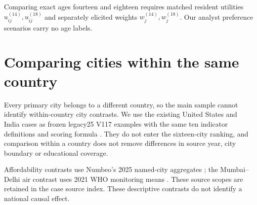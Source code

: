 \AgeCase



Comparing exact ages fourteen and eighteen requires matched resident utilities
$u_{ij}^{(14)},u_{ij}^{(18)}$ and separately elicited weights
$w_j^{(14)},w_j^{(18)}$. Our analyst preference scenarios carry no age labels.

\section{Comparing cities within the same country}
Every primary city belongs to a different country, so the main sample cannot
identify within-country city contrasts. We use the existing United States and
India cases as frozen legacy25 V117 examples with the same ten indicator
definitions and scoring formula \cite{legacycase}. They do not enter the sixteen-city ranking,
and comparison within a country does not remove differences in source year,
city boundary or educational coverage.



\CountryInterpretation
Affordability contrasts use Numbeo's 2025 named-city aggregates
\cite{numbeocase}; the Mumbai--Delhi air contrast uses 2021 WHO monitoring
means \cite{whocase}. These source scopes are retained in the case source index.
These descriptive contrasts do not identify a national causal effect.

\FloatBarrier

